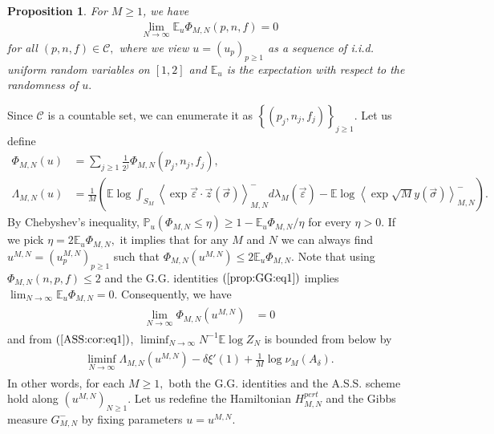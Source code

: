 \documentclass[12pt]{article}
\newcommand{\veps}{\vec{\varepsilon}}
\newcommand{\vsi}{{\vec{\sigma}}}
\newcommand{\vz}{\vec{z}}
\newtheorem{proposition}{\bf Proposition}
\newenvironment{Proof of lemma}{\noindent{\bf Proof of Lemma}}{\hfill$\Box$\newline}
\newenvironment{Proof of theorem}{\noindent{\bf Proof of Theorem}}{\hfill{\footnotesize${\square}$}\newline}
\newenvironment{Proof of theorems}{\noindent{\bf Proof of Theorems}}{\hfill$\Box$\newline}
\newenvironment{Proof of proposition}{\noindent{\bf Proof of Proposition}}{\hfill$\Box$\newline}
\newenvironment{Proof of propositions}{\noindent{\bf Proof of Propositions}}{\hfill$\Box$\newline}
\newenvironment{Proof of exercise}{\noindent{\it Proof of Exercise:}}{\hfill$\Box$}
\numberwithin{equation}{section}
\begin{document}
\begin{proposition}\label{prop:GG}
For $M\geq 1$, we have 
\begin{align}\label{prop:GG:eq1}
\lim_{N\rightarrow\infty}\mathbb{E}_u\Phi_{M,N}(p,n,f)=0
\end{align}
for all $(p,n,f)\in\mathcal{C},$ where we view $u=(u_p)_{p\geq 1}$ as a sequence of i.i.d. uniform random variables on $\left[1,2\right]$ and $\mathbb{E}_u$ is the expectation with respect to the randomness of $u.$
\end{proposition}
\smallskip

\noindent Since $\mathcal{C}$ is a countable set, we can enumerate it as $\left\{(p_j,n_j,f_j)\right\}_{j\geq 1}.$
Let us define 
\begin{align*}
\Phi_{M,N}(u)&=\sum_{j\geq 1}\frac{1}{2^j}\Phi_{M,N}(p_j,n_j,f_j),\\
\Lambda_{M,N}(u)&=\frac{1}{M}\left(\mathbb{E}\log\int_{S_M}\left<\exp \veps\cdot\vz(\vsi)\right>_{M,N}^-d\lambda_M(\veps)
-\mathbb{E}\log \left<\exp \sqrt{M}y(\vsi)\right>_{M,N}^-\right).
\end{align*} 
By Chebyshev's inequality, $\mathbb{P}_u(\Phi_{M,N}\leq \eta)\geq 1-\mathbb{E}_u\Phi_{M,N}/\eta$ for every $\eta>0.$ If we pick $\eta=2\mathbb{E}_u\Phi_{M,N},$ it implies that for any $M$ and $N$ we can always find $u^{M,N}=(u_p^{M,N})_{p\geq 1}$ such that 
$\Phi_{M,N}(u^{M,N})\leq 2\mathbb{E}_u\Phi_{M,N}$. Note that using $\Phi_{M,N}(n,p,f)\leq 2$ and the G.G. identities $(\ref{prop:GG:eq1})$ implies $\lim_{N\rightarrow\infty}\mathbb{E}_u\Phi_{M,N}=0.$ Consequently, we have
\begin{align}
\begin{split}\label{AGM:eq2}
\lim_{N\rightarrow\infty}\Phi_{M,N}(u^{M,N})&=0
\end{split}
\end{align}
and from $(\ref{ASS:cor:eq1})$, $\liminf_{N\rightarrow\infty}N^{-1}\mathbb{E}\log Z_N$ is bounded from below by
\begin{align}
\begin{split}\label{AGM:eq2.1}
\liminf_{N\rightarrow\infty}\Lambda_{M,N}(u^{M,N})-\delta\xi'(1)+\frac{1}{M}\log \nu_M(A_\delta).
\end{split}
\end{align} 
In other words, for each $M\geq 1,$ both the G.G. identities and the A.S.S. scheme hold along $(u^{M,N})_{N\geq 1}$.
Let us redefine the Hamiltonian $H_{M,N}^{pert}$ and the Gibbs measure $G_{M,N}^-$ by fixing parameters $u=u^{M,N}.$
\end{document}

